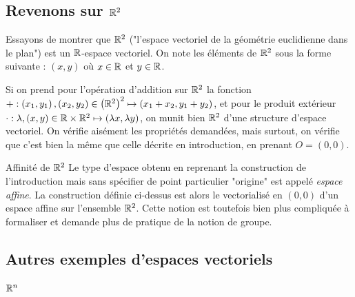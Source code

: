 \documentclass{classe}
\begin{document}
\subsection{Revenons sur $\mathbb{R}^2$}

Essayons de montrer que $\mathbb{R}^2$ ("l'espace vectoriel de la géométrie euclidienne dans le plan") est un $\mathbb{R}$-espace vectoriel. On note les éléments de $\mathbb{R}^2$ sous la forme suivante : $(x, y)$ où $x\in\mathbb{R}$ et $y\in\mathbb{R}$.


Si on prend pour l'opération d'addition sur $\mathbb{R}^{2}$ la fonction $+: \left( x_{1}, y_{1} \right), \left( x_{2}, y_{2} \right) \in \left(\mathbb{R}^{2}\right)^{2} \mapsto \left( x_{1} + x_{2}, y_{1} + y_{2} \right)$, et pour le produit extérieur $\cdot: \lambda, (x, y) \in \mathbb{R}\times \mathbb{R}^{2} \mapsto \left( \lambda x, \lambda y \right)$, on munit bien $\mathbb{R}^{2}$ d'une structure d'espace vectoriel.
On vérifie aisément les propriétés demandées, mais surtout, on vérifie que c'est bien la même que celle décrite en introduction, en prenant $O = \left( 0, 0 \right)$.

\begin{remarque}{Affinité de $\mathbb{R}^{2}$}{}
	Le type d'espace obtenu en reprenant la construction de l'introduction mais sans spécifier de point particulier "origine" est appelé \emph{espace affine}.
	La construction définie ci-dessus est alors le vectorialisé en $\left(0, 0\right)$ d'un espace affine sur l'ensemble $\mathbb{R}^{2}$.
	Cette notion est toutefois bien plus compliquée à formaliser et demande plus de pratique de la notion de groupe.
\end{remarque}

\subsection{Autres exemples d'espaces vectoriels}

\subsubsection{$\mathbb{R}^n$}
\end{document}
